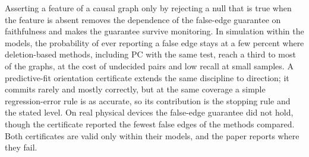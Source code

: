 Asserting a feature of a causal graph only by rejecting a null that is true when
the feature is absent removes the dependence of the false-edge guarantee on
faithfulness and makes the guarantee survive monitoring. In simulation within the
models, the probability of ever reporting a false edge stays at a few percent where
deletion-based methods, including PC with the same test, reach a third to most of the
graphs, at the cost of undecided pairs and low recall at small samples. A
predictive-fit orientation certificate extends the same discipline to direction; it
commits rarely and mostly correctly, but at the same coverage a simple regression-error
rule is as accurate, so its contribution is the stopping rule and the stated level.
On real physical devices the false-edge guarantee did not hold, though the certificate
reported the fewest false edges of the methods compared. Both certificates are valid
only within their models, and the paper reports where they fail.
